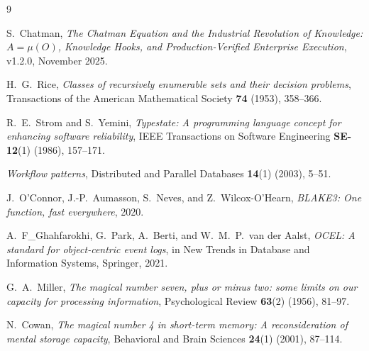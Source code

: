 \documentclass[11pt,oneside]{book}
\theoremstyle{definition}
\theoremstyle{plain}
\theoremstyle{remark}
\begin{document}
\begin{thebibliography}{9}

S.~Chatman,
\emph{The Chatman Equation and the Industrial Revolution of Knowledge:
$A=\mu(O)$, Knowledge Hooks, and Production-Verified Enterprise Execution},
v1.2.0, November 2025.

H.~G.~Rice,
\emph{Classes of recursively enumerable sets and their decision problems},
Transactions of the American Mathematical Society \textbf{74} (1953), 358--366.

R.~E.~Strom and S.~Yemini,
\emph{Typestate: A programming language concept for enhancing software reliability},
IEEE Transactions on Software Engineering \textbf{SE-12}(1) (1986), 157--171.

\emph{Workflow patterns},
Distributed and Parallel Databases \textbf{14}(1) (2003), 5--51.

J.~O'Connor, J.-P.~Aumasson, S.~Neves, and Z.~Wilcox-O'Hearn,
\emph{BLAKE3: One function, fast everywhere},
2020.

A.~F\_Ghahfarokhi, G.~Park, A.~Berti, and W.~M.~P.~van der Aalst,
\emph{OCEL: A standard for object-centric event logs},
in New Trends in Database and Information Systems, Springer, 2021.

G.~A.~Miller,
\emph{The magical number seven, plus or minus two: some limits on our capacity
for processing information},
Psychological Review \textbf{63}(2) (1956), 81--97.

N.~Cowan,
\emph{The magical number 4 in short-term memory: A reconsideration of mental
storage capacity},
Behavioral and Brain Sciences \textbf{24}(1) (2001), 87--114.

\end{thebibliography}
\end{document}
